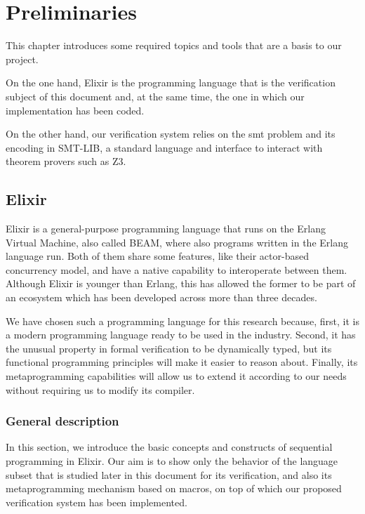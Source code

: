 \chapter{Preliminaries}
\label{cap:preliminaries}

This chapter introduces some required topics and tools that are a basis to our
project.

On the one hand, Elixir is the programming language that is the verification
subject of this document and, at the same time, the one in which our
implementation has been coded.

On the other hand, our verification system relies on the \gls{smt} problem and
its encoding in SMT-LIB, a standard language and interface to interact with
theorem provers such as Z3.

\section{Elixir}

Elixir is a general-purpose programming language that runs on the Erlang Virtual
Machine, also called BEAM, where also programs written in the Erlang language
run. Both of them share some features, like their actor-based concurrency model,
and have a native capability to interoperate between them. Although Elixir is
younger than Erlang, this has allowed the former to be part of an ecosystem
which has been developed across more than three decades.

We have chosen such a programming language for this research because, first, it
is a modern programming language ready to be used in the industry.  Second, it
has the unusual property in formal verification to be dynamically typed, but its
functional programming principles will make it easier to reason about. Finally,
its metaprogramming capabilities will allow us to extend it according to our
needs without requiring us to modify its compiler.

\subsection{General description}
\label{prelim:elixir}

In this section, we introduce the basic concepts and constructs of sequential
programming in Elixir. Our aim is to show only the behavior of the language
subset that is studied later in this document for its verification, and also its
metaprogramming mechanism based on macros, on top of which our proposed
verification system has been implemented.

